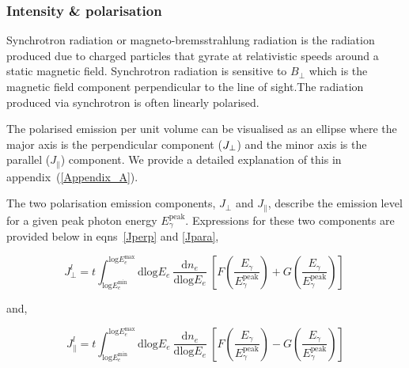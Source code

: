 \documentclass[usenatbib]{mnras}
\begin{document}
\subsubsection{Intensity \& polarisation}
Synchrotron radiation or magneto-bremsstrahlung radiation is the radiation produced due to charged particles that gyrate at relativistic speeds around a static magnetic field. Synchrotron radiation is sensitive to $B_{\perp}$ which is the magnetic field component perpendicular to the line of sight.The radiation produced via synchrotron is often linearly polarised. 

The polarised emission per unit volume can be visualised as an ellipse where the major axis is the perpendicular component ($J_{\rm \perp}$) and the minor axis is the parallel ($J_{\parallel}$) component. We provide a detailed explanation of this in appendix~(\ref{Appendix_A}). 

The two polarisation emission components, $J_{\perp}$ and $J_{\parallel}$, describe the emission level for a  given peak photon energy $E_{\gamma}^{\mathrm{peak}}$. Expressions for these two components are provided below in eqns~\ref{Jperp} and \ref{Jpara},

\begin{equation}
 {J_{\perp}^l} = t  \int_{\mathrm{log}E_e^{\mathrm{min}}}^{\mathrm{log}E_e^{\mathrm{max}}}\mathrm{dlog}E_{e} \  \frac{\mathrm{d}n_e}{\mathrm{dlog}E_{e}} \  \left[F\left(\frac{E_{\gamma}}{E_{\gamma}^{\mathrm{peak}}}\right) + G\left(\frac{E_{\gamma}}{E_{\gamma}^{\mathrm{peak}}}\right)\right] \
 \label{Jperp}
\end{equation}

and,

\begin{equation}
{J_{\parallel}^l} = t \int_{\mathrm{log}E_e^{\mathrm{min}}}^{\mathrm{log}E_e^{\mathrm{max}}}\mathrm{dlog}E_{e} \ \frac{\mathrm{d}n_e}{\mathrm{dlog}E_{e}} \  \left[F\left(\frac{E_{\gamma}}{E_{\gamma}^{\mathrm{peak}}}\right) - G\left(\frac{E_{\gamma}}{E_{\gamma}^{\mathrm{peak}}}\right)\right] 
\label{Jpara}
\end{equation}
\end{document}
